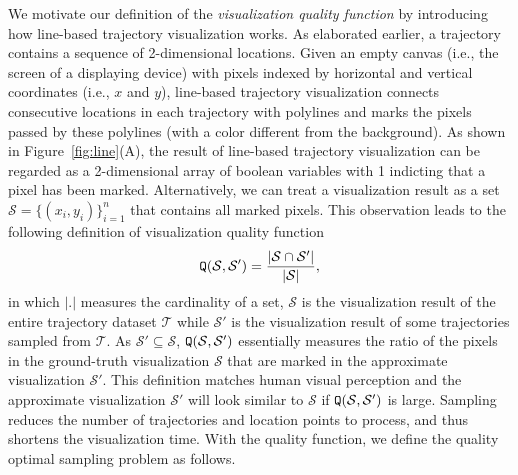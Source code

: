 We motivate our definition of the \textit{visualization quality function} by introducing how line-based trajectory visualization works.
As elaborated earlier, a trajectory contains a sequence of 2-dimensional locations.
Given an empty canvas (i.e., the screen of a displaying device) with pixels indexed by horizontal and vertical coordinates (i.e., $x$ and $y$), line-based trajectory visualization connects consecutive locations in each trajectory with polylines and marks the pixels passed by these polylines (with a color different from the background).
As shown in Figure~\ref{fig:line}(A), the result of line-based trajectory visualization can be regarded as a 2-dimensional array of boolean variables with 1 indicting that a pixel has been marked.
Alternatively, we can treat a visualization result as a set $\mathcal{S}=\{(x_i, y_i)\}_{i=1}^{n}$ that contains all marked pixels.
This observation leads to the following definition of visualization quality function
\begin{equation}\label{eqref:loss}
\QQ(\mathcal{S}, \mathcal{S}')=\frac{|\mathcal{S} \cap \mathcal{S}'|}{|\mathcal{S}|},
\end{equation}
in which $|.|$ measures the cardinality of a set, $\mathcal{S}$ is the visualization result of the entire trajectory dataset $\mathcal{T}$ while $ \mathcal{S}'$ is the visualization result of some trajectories sampled from $\mathcal{T}$.
As $\mathcal{S}'\subseteq \mathcal{S}$, $\mathtt{Q}(\mathcal{S}, \mathcal{S}')$ essentially measures the ratio of the pixels in the ground-truth visualization $\mathcal{S}$ that are marked in the approximate visualization $\mathcal{S}'$.
This definition matches human visual perception and the approximate visualization $\mathcal{S}'$ will look similar to $\mathcal{S}$ if $\mathtt{Q}(\mathcal{S}, \mathcal{S}')$ is large.
Sampling reduces the number of trajectories and location points to process, and thus shortens the visualization time.
With the quality function, we define the quality optimal sampling problem as follows.

